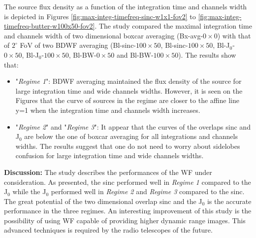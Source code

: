 \documentclass[useAMS,usenatbib]{mn2e}
\begin{document}
The source flux density as a function of the integration time and channels width is depicted in Figures 
\ref{fig:max-integ-timefreq-sinc-w1x1-fov2} to 
 \ref{fig:max-integ-timefreq-butter-w100x50-fov2}. The study compared the maximal integration time and channels width of two dimensional 
boxcar  averaging (Bx-avg-$0\times 0$) 
with that of  $2^{\circ}$ FoV of two BDWF averaging (Bl-sinc-$100\times 50$, Bl-sinc-$100\times 50$, Bl-J$_0$-$0\times 50$, 
Bl-J$_0$-$100\times 50$, Bl-BW-$0\times 50$ and Bl-BW-$100\times 50$). 
The results show that:
\begin{itemize}
 \item "\textit{Regime 1}": BDWF averaging maintained the flux density of the source for large integration time and wide channels widths. 
However, 
it is seen on the Figures that the curve of sources in the regime are closer to the affine line y=1 when the integration time and 
channels width increases.
 \item  "\textit{Regime 2}" and "\textit{Regime 3}":  It appear that the curves of the overlaps sinc and J$_0$ are below the one of boxcar 
averaging for all integrations and channels widths. The 
results suggest that one do not need to worry about sidelobes confusion for large integration time and wide channels widths. 
\end{itemize}

\hspace{-0.64cm}\textbf{Discussion:}
The study describes the performances of the WF under consideration. As presented, the sinc performed well in \textit{Regime 1} compared 
to the J$_0$ while the J$_0$ performed well in \textit{Regime 2} and \textit{Regime 3} compared to the sinc. The great potential  of the 
two dimensional overlap sinc and the J$_0$ is the accurate performance in the three regimes. An interesting improvement of this study is 
the possibility of using WF capable of providing higher dynamic range images. This advanced techniques 
is required by the radio telescopes of the future.
\end{document}
